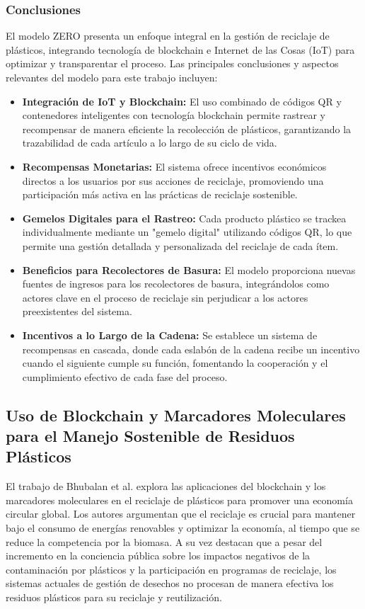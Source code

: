 \documentclass[main.tex]{subfiles}
\begin{document}
\subsubsection{Conclusiones}
El modelo ZERO presenta un enfoque integral en la gestión de reciclaje de plásticos, integrando tecnología de blockchain e Internet de las Cosas (IoT) para optimizar y transparentar el proceso. Las principales conclusiones y aspectos relevantes del modelo para este trabajo incluyen:

\begin{itemize}
    \item \textbf{Integración de IoT y Blockchain:} El uso combinado de códigos QR y contenedores inteligentes con tecnología blockchain permite rastrear y recompensar de manera eficiente la recolección de plásticos, garantizando la trazabilidad de cada artículo a lo largo de su ciclo de vida.
    \item \textbf{Recompensas Monetarias:} El sistema ofrece incentivos económicos directos a los usuarios por sus acciones de reciclaje, promoviendo una participación más activa en las prácticas de reciclaje sostenible.
    \item \textbf{Gemelos Digitales para el Rastreo:} Cada producto plástico se trackea individualmente mediante un "gemelo digital" utilizando códigos QR, lo que permite una gestión detallada y personalizada del reciclaje de cada ítem.
    \item \textbf{Beneficios para Recolectores de Basura:} El modelo proporciona nuevas fuentes de ingresos para los recolectores de basura, integrándolos como actores clave en el proceso de reciclaje sin perjudicar a los actores preexistentes del sistema.
    \item \textbf{Incentivos a lo Largo de la Cadena:} Se establece un sistema de recompensas en cascada, donde cada eslabón de la cadena recibe un incentivo cuando el siguiente cumple su función, fomentando la cooperación y el cumplimiento efectivo de cada fase del proceso.
\end{itemize}

\subsection{Uso de Blockchain y Marcadores Moleculares para el Manejo Sostenible de Residuos Plásticos}

El trabajo de Bhubalan et al. \cite{BHUBALAN2022113631} explora las aplicaciones del blockchain y los marcadores moleculares en el reciclaje de plásticos para promover una economía circular global. Los autores argumentan que el reciclaje es crucial para mantener bajo el consumo de energías renovables y optimizar la economía, al tiempo que se reduce la competencia por la biomasa.
A su vez destacan que a pesar del incremento en la conciencia pública sobre los impactos negativos de la contaminación por plásticos y la participación en programas de reciclaje, los sistemas actuales de gestión de desechos no procesan de manera efectiva los residuos plásticos para su reciclaje y reutilización.
\end{document}
